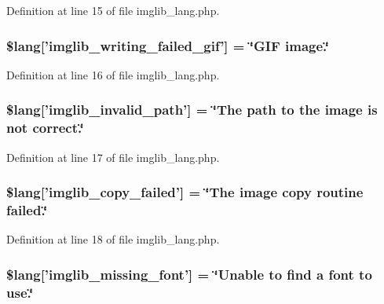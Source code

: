 Definition at line 15 of file imglib\-\_\-lang.\-php.

\subsubsection[{\$lang}]{\setlength{\rightskip}{0pt plus 5cm}\$lang['imglib\-\_\-writing\-\_\-failed\-\_\-gif'] = \char`\"{}G\-I\-F image.\char`\"{}}\label{imglib__lang_8php_a6169e9ed18d970dcc8965c4f195ae3e7}


Definition at line 16 of file imglib\-\_\-lang.\-php.

\subsubsection[{\$lang}]{\setlength{\rightskip}{0pt plus 5cm}\$lang['imglib\-\_\-invalid\-\_\-path'] = \char`\"{}The path {\bf to} the image is {\bf not} correct.\char`\"{}}\label{imglib__lang_8php_a8ff486c25806a4731d1ffe20431df825}


Definition at line 17 of file imglib\-\_\-lang.\-php.

\subsubsection[{\$lang}]{\setlength{\rightskip}{0pt plus 5cm}\$lang['imglib\-\_\-copy\-\_\-failed'] = \char`\"{}The image copy routine failed.\char`\"{}}\label{imglib__lang_8php_a9363000d2005b8276b39d581a11b562d}


Definition at line 18 of file imglib\-\_\-lang.\-php.

\subsubsection[{\$lang}]{\setlength{\rightskip}{0pt plus 5cm}\$lang['imglib\-\_\-missing\-\_\-font'] = \char`\"{}Unable {\bf to} find {\bf a} font {\bf to} use.\char`\"{}}\label{imglib__lang_8php_a935800aad2be18ca4fe99bb074674848}



